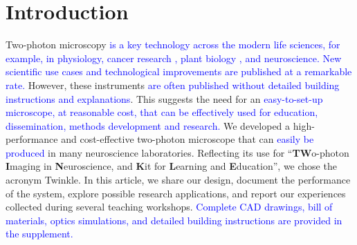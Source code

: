 \documentclass[10pt,letterpaper]{article}
\begin{document}
\linenumbers

\section*{Introduction}
%
Two-photon microscopy\cite{Denk1990, Svoboda1997} \textcolor{blue}{is a key technology across the modern life sciences\cite{Zipfel2003}, for example, in physiology\cite{Ueki2020, Dunn2002}, cancer research \cite{Perry2012}, plant biology \cite{Cheung2010}, and neuroscience\cite{So2000, Helmchen2005}. New scientific use cases and technological improvements are published at a remarkable rate\cite{Luu2024}.} However, these instruments \textcolor{blue}{are often published without detailed building instructions and explanations}. This suggests the need for an \textcolor{blue}{easy-to-set-up microscope, at reasonable cost, that can be effectively used for education, dissemination, methods development and research.} We developed a high-performance and cost-effective two-photon microscope that can \textcolor{blue}{easily be produced} in many neuroscience laboratories. Reflecting its use for ``\textbf{TW}o-photon \textbf{I}maging in \textbf{N}euroscience, and \textbf{K}it for \textbf{L}earning and \textbf{E}ducation'', we chose the acronym Twinkle. In this article, we share our design, document the performance of the system, explore possible research applications, and report our experiences collected during several teaching workshops. \textcolor{blue}{Complete CAD drawings, bill of materials, optics simulations, and detailed building instructions are provided in the supplement.}
\end{document}
